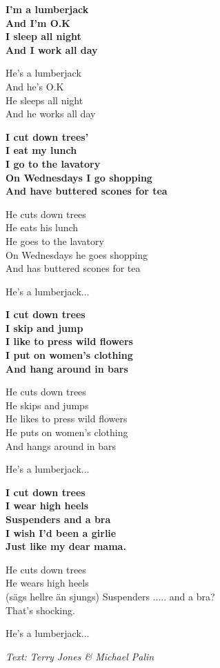 \vspace{10pt}
\textbf{I'm a lumberjack\\
And I'm O.K\\
I sleep all night\\
And I work all day}\par
\vspace{10pt}
He's a lumberjack\\
And he's O.K\\
He sleeps all night\\
And he works all day\par
\vspace{10pt}
\textbf{I cut down trees'\\
I eat my lunch\\
I go to the lavatory\\
On Wednesdays I go shopping\\
And have buttered scones for tea}\par
\vspace{10pt}
He cuts down trees\\
He eats his lunch\\
He goes to the lavatory\\
On Wednesdays he goes shopping\\
And has buttered scones for tea\par
\vspace{10pt}
He's a lumberjack...\par
\vspace{10pt}
\textbf{I cut down trees\\
I skip and jump\\
I like to press wild flowers\\
I put on women's clothing\\
And hang around in bars}\par
\newpage
He cuts down trees\\
He skips and jumps\\
He likes to press wild flowers\\
He puts on women's clothing\\
And hangs around in bars\par
\vspace{10pt}
He's a lumberjack...\par
\vspace{10pt}
\textbf{I cut down trees\\
I wear high heels\\
Suspenders and a bra\\
I wish I'd been a girlie\\
Just like my dear mama.}\par
\vspace{10pt}
He cuts down trees\\
He wears high heels\\
(sägs hellre än sjungs) Suspenders ..... and a bra?\\
That's shocking.\par
\vspace{10pt}
He's a lumberjack...
\par
\vspace{10pt}
{\footnotesize\textit{Text: Terry Jones \& Michael Palin}}
